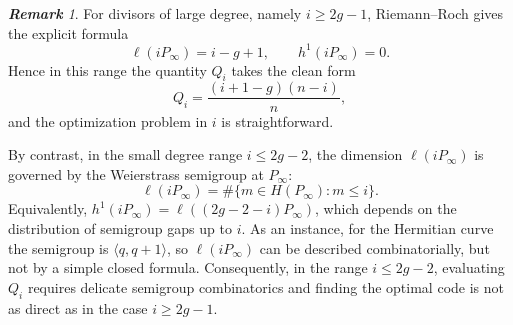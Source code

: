 \documentclass[14pt]{amsart}
\theoremstyle{plain}
\theoremstyle{definition}
\theoremstyle{remark}
\newtheorem{rem}[thm]{\bf Remark}
\theoremstyle{example}
\def \C{\mathcal{C}}
\begin{document}



\begin{rem}
For divisors of large degree, namely $i\geq 2g-1$, Riemann--Roch gives the
explicit formula
\[
\ell(iP_\infty)=i-g+1, \qquad h^1(iP_\infty)=0.
\]
Hence in this range the quantity $Q_i$ takes the clean form
\[
Q_i=\frac{(i+1-g)(n-i)}{n},
\]
and the optimization problem in $i$ is straightforward.

By contrast, in the small degree range $i\leq 2g-2$, the dimension
$\ell(iP_\infty)$ is governed by the Weierstrass semigroup at $P_\infty$:
\[
\ell(iP_\infty)=\#\{m\in H(P_\infty): m\leq i\}.
\]
Equivalently, $h^1(iP_\infty)=\ell((2g-2-i)P_\infty)$, which depends on the
distribution of semigroup gaps up to $i$. As an instance, for the Hermitian curve the
semigroup is $\langle q,q+1\rangle$, so $\ell(iP_\infty)$ can be described
combinatorially, but not by a simple closed formula. Consequently, in the
range $i\leq 2g-2$, evaluating $Q_i$ requires delicate semigroup
combinatorics and finding the optimal code is not as direct as in the case
$i\geq 2g-1$.
\end{rem}
\end{document}
